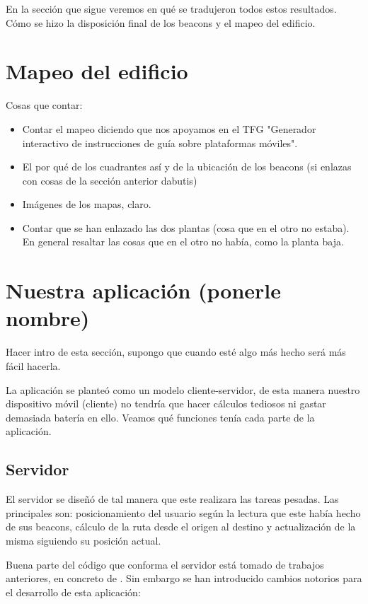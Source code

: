En la sección que sigue veremos en qué se tradujeron todos estos resultados. Cómo se hizo la disposición final de los beacons y el mapeo del edificio.


\section{Mapeo del edificio}
\label{sec:mapeo}
Cosas que contar:

\begin{itemize}
	\item Contar el mapeo diciendo que nos apoyamos en el TFG "Generador interactivo de instrucciones
	de guía sobre plataformas móviles".
	\item El por qué de los cuadrantes así y de la ubicación de los beacons (si enlazas con cosas de la sección anterior dabutis)
	\item Imágenes de los mapas, claro.
	\item Contar que se han enlazado las dos plantas (cosa que en el otro no estaba). En general resaltar las cosas que en el otro no había, como la planta baja.
\end{itemize}

\section{Nuestra aplicación (ponerle nombre)}

Hacer intro de esta sección, supongo que cuando esté algo más hecho será más fácil hacerla.

La aplicación se planteó como un modelo cliente-servidor, de esta manera nuestro dispositivo móvil (cliente) no tendría que hacer cálculos tediosos ni gastar demasiada batería en ello. Veamos qué funciones tenía cada parte de la aplicación.


\subsection{Servidor}
El servidor se diseñó de tal manera que este realizara las tareas pesadas. Las principales son: posicionamiento del usuario según la lectura que este había hecho de sus beacons, cálculo de la ruta desde el origen al destino y actualización de la misma siguiendo su posición actual.  

Buena parte del código que conforma el servidor está tomado de trabajos anteriores, en concreto de \cite{TFGguia}. Sin embargo se han introducido cambios notorios para el desarrollo de esta aplicación: 

